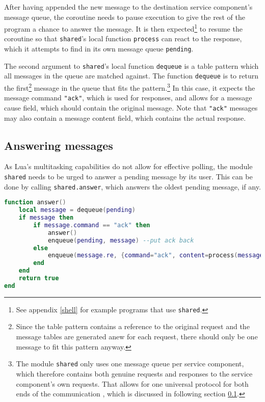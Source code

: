 After having appended the new message to the destination service component's message queue, the coroutine needs to pause execution to give the rest of the program a chance to answer the message. It is then expected\footnote{See appendix \ref{shell} for example programs that use \texttt{shared}.} to resume the coroutine so that \texttt{shared}'s local function \texttt{process} can react to the response, which it attempts to find in its own message queue \texttt{pending}.

The second argument to \texttt{shared}'s local function \texttt{dequeue} is a table pattern which all messages in the queue are matched against. The function \texttt{dequeue} is to return the first\footnote{Since the table pattern contains a reference to the original request and the message tables are generated anew for each request, there should only be one message to fit this pattern anyway.} message in the queue that fits the pattern.\footnote{The module \texttt{shared} only uses one message queue per service component, which therefore contains both genuine requests and responses to the service component's own requests. That allows for one universal protocol for both ends of the communication , which is discussed in following section \ref{sec:messaging:answering}.} In this case, it expects the message command \texttt{"ack"}, which is used for responses, and allows for a message cause field, which should contain the original message. Note that \texttt{"ack"} messages may also contain a message content field, which contains the actual response.

\subsection{Answering messages}
\label{sec:messaging:answering}

As Lua's multitasking capabilities do not allow for effective polling, the module \texttt{shared} needs to be urged to answer a pending message by its user. This can be done by calling \texttt{shared.answer}, which answers the oldest pending message, if any.

\begin{lstlisting}[language=lua, caption={The function \texttt{answer} of the module \texttt{shared}}, label=lst:sharedanswer, name=lst:sharedanswer]
function answer()
	local message = dequeue(pending)
	if message then
		if message.command == "ack" then
			answer()
			enqueue(pending, message) --put ack back
		else
			enqueue(message.re, {command="ack", content=process(message), cause=message})
		end
	end
	return true
end
\end{lstlisting}

